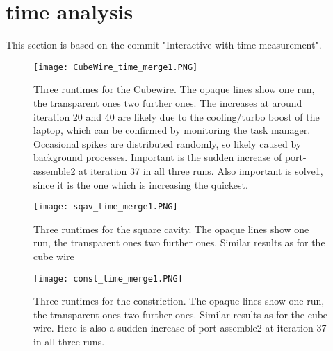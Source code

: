 




\section{time analysis}
This section is based on the commit "Interactive with time measurement".

\begin{figure}[h]
	\centering
	\texttt{[image: CubeWire\_time\_merge1.PNG]}
	\caption{Three runtimes for the Cubewire. The opaque lines show one run, the transparent ones two further ones. The increases at around iteration 20 and 40 are likely due to the cooling/turbo boost of the laptop, which can be confirmed by monitoring the task manager. Occasional spikes are distributed randomly, so likely caused by background processes. Important is the sudden increase of port-assemble2 at iteration 37 in all three runs. Also important is solve1, since it is the one which is increasing the quickest.}
	\label{}
\end{figure}


\begin{figure}[h]
	\centering
	\texttt{[image: sqav\_time\_merge1.PNG]}
	\caption{Three runtimes for the square cavity. The opaque lines show one run, the transparent ones two further ones. Similar results as for the cube wire}
	\label{}
\end{figure}



\begin{figure}[h]
	\centering
	\texttt{[image: const\_time\_merge1.PNG]}
	\caption{Three runtimes for the constriction. The opaque lines show one run, the transparent ones two further ones. Similar results as for the cube wire. Here is also a sudden increase of port-assemble2 at iteration 37 in all three runs.}
	\label{}
\end{figure}


































